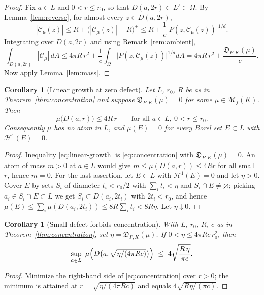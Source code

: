 \documentclass[reqno]{amsart}
\newtheorem{corollary}[theorem]{Corollary}
\theoremstyle{definition}
\theoremstyle{remark}
\newcommand{\M}{\mathcal M}
\newcommand{\Cauchy}{\mathcal C}
\newcommand{\Hone}{\mathcal H^1}
\begin{document}
\begin{proof}
Fix $a\in L$ and $0<r\leq r_0$, so that $D(a,2r)\subset L'\subset\Omega$.  By
Lemma~\ref{lem:reverse}, for almost every $z\in D(a,2r)$,
\[
 |\Cauchy_\mu(z)|
 \leq R+\bigl(|\Cauchy_\mu(z)|-R\bigr)^{+}
 \leq R+\frac1c\bigl|P(z,\Cauchy_\mu(z))\bigr|^{1/d} .
\]
Integrating over $D(a,2r)$ and using Remark~\ref{rem:ambient},
\[
 \int_{D(a,2r)}|\Cauchy_\mu|\,dA
 \leq 4\pi R\,r^2+\frac1c\int_\Omega\bigl|P(z,\Cauchy_\mu(z))\bigr|^{1/d}dA
 =4\pi R\,r^2+\frac{\mathfrak D_{P,K}(\mu)}{c}.
\]
Now apply Lemma~\ref{lem:mass}.
\end{proof}

\begin{corollary}[Linear growth at zero defect]\label{cor:linear-growth}
Let $L$, $r_0$, $R$ be as in Theorem~\ref{thm:concentration} and suppose
$\mathfrak D_{P,K}(\mu)=0$ for some $\mu\in\M_f(K)$.  Then
\begin{equation}\label{eq:linear-growth}
 \mu\bigl(D(a,r)\bigr)\leq 4R\,r
 \qquad\text{for all }a\in L,\ 0<r\leq r_0 .
\end{equation}
Consequently $\mu$ has no atom in $L$, and $\mu(E)=0$ for every Borel set
$E\subset L$ with $\Hone(E)=0$.
\end{corollary}

\begin{proof}
Inequality \eqref{eq:linear-growth} is \eqref{eq:concentration} with
$\mathfrak D_{P,K}(\mu)=0$.  An atom of mass $m>0$ at $a\in L$ would give
$m\leq\mu(D(a,r))\leq4Rr$ for all small $r$, hence $m=0$.  For the last
assertion, let $E\subset L$ with $\Hone(E)=0$ and let $\eta>0$.  Cover $E$ by
sets $S_i$ of diameter $t_i<r_0/2$ with $\sum_it_i<\eta$ and $S_i\cap E\neq
\varnothing$; picking $a_i\in S_i\cap E\subset L$ we get $S_i\subset
D(a_i,2t_i)$ with $2t_i<r_0$, and hence
$\mu(E)\leq\sum_i\mu(D(a_i,2t_i))\leq8R\sum_it_i<8R\eta$.  Let $\eta\downarrow0$.
\end{proof}

\begin{corollary}[Small defect forbids concentration]\label{cor:small-defect}
With $L$, $r_0$, $R$, $c$ as in Theorem~\ref{thm:concentration}, set
$\eta=\mathfrak D_{P,K}(\mu)$.  If $0<\eta\leq4\pi Rc\,r_0^2$, then
\[
 \sup_{a\in L}\ \mu\Bigl(D\bigl(a,\sqrt{\eta/(4\pi Rc)}\bigr)\Bigr)
 \ \leq\ 4\sqrt{\frac{R\,\eta}{\pi c}} .
\]
\end{corollary}

\begin{proof}
Minimize the right-hand side of \eqref{eq:concentration} over $r>0$; the minimum
is attained at $r=\sqrt{\eta/(4\pi Rc)}$ and equals $4\sqrt{R\eta/(\pi c)}$.
\end{proof}
\end{document}
